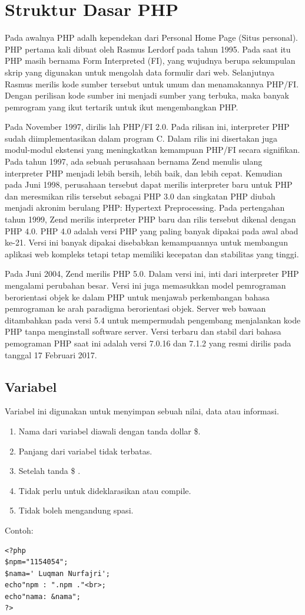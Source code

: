 \section{Struktur Dasar PHP}
Pada awalnya PHP adalh kependekan dari Personal Home Page (Situs personal). PHP pertama kali dibuat oleh Rasmus Lerdorf pada tahun 1995. Pada saat itu PHP masih bernama Form Interpreted (FI), yang wujudnya berupa sekumpulan skrip yang digunakan untuk mengolah data formulir dari web. Selanjutnya Rasmus merilis kode sumber tersebut untuk umum dan menamakannya PHP/FI. Dengan perilisan kode sumber ini menjadi sumber yang terbuka, maka banyak pemrogram yang ikut tertarik untuk ikut mengembangkan PHP.
\par
Pada November 1997, dirilis lah PHP/FI 2.0. Pada rilisan ini, interpreter PHP sudah diimplementasikan dalam program C. Dalam rilis ini disertakan juga modul-modul ekstensi yang meningkatkan kemampuan PHP/FI secara signifikan. Pada tahun 1997, ada sebuah perusahaan bernama Zend menulis ulang interpreter PHP menjadi lebih bersih, lebih baik, dan lebih cepat. Kemudian pada Juni 1998, perusahaan tersebut dapat merilis interpreter baru untuk PHP dan meresmikan rilis tersebut sebagai PHP 3.0 dan singkatan PHP diubah menjadi akronim berulang PHP: Hypertext Preprocessing. Pada pertengahan tahun 1999, Zend merilis interpreter PHP baru dan rilis tersebut dikenal dengan PHP 4.0. PHP 4.0 adalah versi PHP yang paling banyak dipakai pada awal abad ke-21. Versi ini banyak dipakai disebabkan kemampuannya untuk membangun aplikasi web kompleks tetapi tetap memiliki kecepatan dan stabilitas yang tinggi. 
\par
Pada Juni 2004, Zend merilis PHP 5.0. Dalam versi ini, inti dari interpreter PHP mengalami perubahan besar. Versi ini juga memasukkan model pemrograman berorientasi objek ke dalam PHP untuk menjawab perkembangan bahasa pemrograman ke arah paradigma berorientasi objek. Server web bawaan ditambahkan pada versi 5.4 untuk mempermudah pengembang menjalankan kode PHP tanpa menginstall software server. Versi terbaru dan stabil dari bahasa pemograman PHP saat ini adalah versi 7.0.16 dan 7.1.2 yang resmi dirilis pada tanggal 17 Februari 2017.

\subsection{Variabel}
Variabel ini digunakan untuk menyimpan sebuah nilai, data atau informasi.
\begin{enumerate}
\item Nama dari variabel diawali dengan tanda dollar \$.
\item Panjang dari variabel tidak terbatas.
\item Setelah tanda \$ .
\item Tidak perlu untuk dideklarasikan atau compile.
\item Tidak boleh mengandung spasi.
\end{enumerate}
Contoh:
\begin{lstlisting}
<?php
$npm="1154054";
$nama=' Luqman Nurfajri';
echo"npm : ".npm ."<br>;
echo"nama: &nama";
?>
\end{lstlisting}

